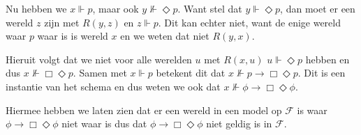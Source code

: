 \documentclass[a4paper,11pt]{article}
\begin{document}
\begin{description}
Nu hebben we $x \Vdash p$, maar ook $y \not \Vdash \Diamond p$. Want stel dat
$y \Vdash \Diamond p$, dan moet er een wereld $z$ zijn met $R(y, z)$ en
$z \Vdash p$. Dit kan echter niet, want de enige wereld waar $p$ waar is is
wereld $x$ en we weten dat niet $R(y, x)$.

Hieruit volgt dat we niet voor alle werelden $u$ met $R(x, u)$
$u \Vdash \Diamond p$ hebben en dus $x \not \Vdash \Box \Diamond p$. Samen met
$x \Vdash p$ betekent dit dat $x \not \Vdash p \rightarrow \Box \Diamond p$.
Dit is een instantie van het schema en dus weten we ook dat
$x \not \Vdash \phi \rightarrow \Box \Diamond \phi$.

Hiermee hebben we laten zien dat er een wereld in een model op $\mathcal{F}$
is waar $\phi \rightarrow \Box \Diamond \phi$ niet waar is dus dat
$\phi \rightarrow \Box \Diamond \phi$ niet geldig is in $\mathcal{F}$.

\end{description}
\end{document}
